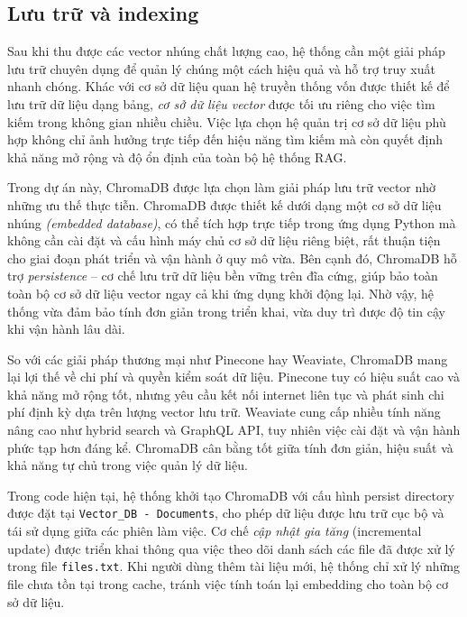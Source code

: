 \subsection{Lưu trữ và indexing}

Sau khi thu được các vector nhúng chất lượng cao, hệ thống cần một giải pháp lưu trữ chuyên dụng để quản lý chúng một cách hiệu quả và hỗ trợ truy xuất nhanh chóng. Khác với cơ sở dữ liệu quan hệ truyền thống vốn được thiết kế để lưu trữ dữ liệu dạng bảng, \emph{cơ sở dữ liệu vector} được tối ưu riêng cho việc tìm kiếm trong không gian nhiều chiều. Việc lựa chọn hệ quản trị cơ sở dữ liệu phù hợp không chỉ ảnh hưởng trực tiếp đến hiệu năng tìm kiếm mà còn quyết định khả năng mở rộng và độ ổn định của toàn bộ hệ thống RAG.

Trong dự án này, ChromaDB được lựa chọn làm giải pháp lưu trữ vector nhờ những ưu thế thực tiễn. ChromaDB được thiết kế dưới dạng một cơ sở dữ liệu nhúng \emph{(embedded database)}, có thể tích hợp trực tiếp trong ứng dụng Python mà không cần cài đặt và cấu hình máy chủ cơ sở dữ liệu riêng biệt, rất thuận tiện cho giai đoạn phát triển và vận hành ở quy mô vừa. Bên cạnh đó, ChromaDB hỗ trợ \emph{persistence} -- cơ chế lưu trữ dữ liệu bền vững trên đĩa cứng, giúp bảo toàn toàn bộ cơ sở dữ liệu vector ngay cả khi ứng dụng khởi động lại. Nhờ vậy, hệ thống vừa đảm bảo tính đơn giản trong triển khai, vừa duy trì được độ tin cậy khi vận hành lâu dài.

So với các giải pháp thương mại như Pinecone hay Weaviate, ChromaDB mang lại lợi thế về chi phí và quyền kiểm soát dữ liệu. Pinecone tuy có hiệu suất cao và khả năng mở rộng tốt, nhưng yêu cầu kết nối internet liên tục và phát sinh chi phí định kỳ dựa trên lượng vector lưu trữ. Weaviate cung cấp nhiều tính năng nâng cao như hybrid search và GraphQL API, tuy nhiên việc cài đặt và vận hành phức tạp hơn đáng kể. ChromaDB cân bằng tốt giữa tính đơn giản, hiệu suất và khả năng tự chủ trong việc quản lý dữ liệu.

Trong code hiện tại, hệ thống khởi tạo ChromaDB với cấu hình persist directory được đặt tại \texttt{Vector\_DB - Documents}, cho phép dữ liệu được lưu trữ cục bộ và tái sử dụng giữa các phiên làm việc. Cơ chế \emph{cập nhật gia tăng} (incremental update) được triển khai thông qua việc theo dõi danh sách các file đã được xử lý trong file \texttt{files.txt}. Khi người dùng thêm tài liệu mới, hệ thống chỉ xử lý những file chưa tồn tại trong cache, tránh việc tính toán lại embedding cho toàn bộ cơ sở dữ liệu.

